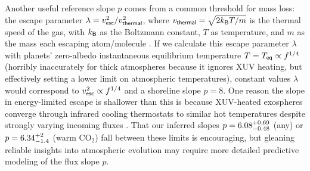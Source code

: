 \documentclass[modern,linenumbers,trackchanges]{aastex7}
\begin{document}
Another useful reference slope $p$ comes from a common threshold for mass loss: the escape parameter $\lambda =  v_{\sf esc}^2/v_{\sf thermal}^2$, where $v_{\sf thermal} = \sqrt{2k_{\sf B} T/m}$  is the thermal speed of the gas, with $k_{\sf B}$ as the Boltzmann constant, $T$ as temperature, and $m$ as the mass each escaping atom/molecule \citep[see][]{schallerVolatileLossRetention2007, johnsonExospheresAtmosphericEscape2008, gronoffAtmosphericEscapeProcesses2020}. If we calculate this escape parameter $\lambda$ with planets' zero-albedo instantaneous equilibrium temperature $T = T_{\sf eq}  \propto f^{1/4}$ (horribly inaccurately for thick atmospheres because it ignores XUV heating, but effectively setting a lower limit on atmospheric temperatures), constant values $\lambda$ would correspond to $v_{\sf esc}^2 \propto f^{1/4}$ and a shoreline slope $p=8$. One reason the slope in energy-limited escape is  shallower than this is because XUV-heated exospheres converge through infrared cooling thermostats to similar hot temperatures despite strongly varying incoming fluxes \citep{chamberlainUpperAtmospheresPlanets1962, murray-clayAtmosphericEscapeHot2009, chatterjeeNovelPhysicsEscaping2024}. That our inferred slopes $p=6.08_{-0.48}^{+0.69}$ (any) or $p=6.34_{-1.4}^{+2}$ (warm CO$_2$) fall between these limits is encouraging, but gleaning reliable insights into atmospheric evolution may require more detailed predictive modeling of the flux slope $p$. 
\end{document}
